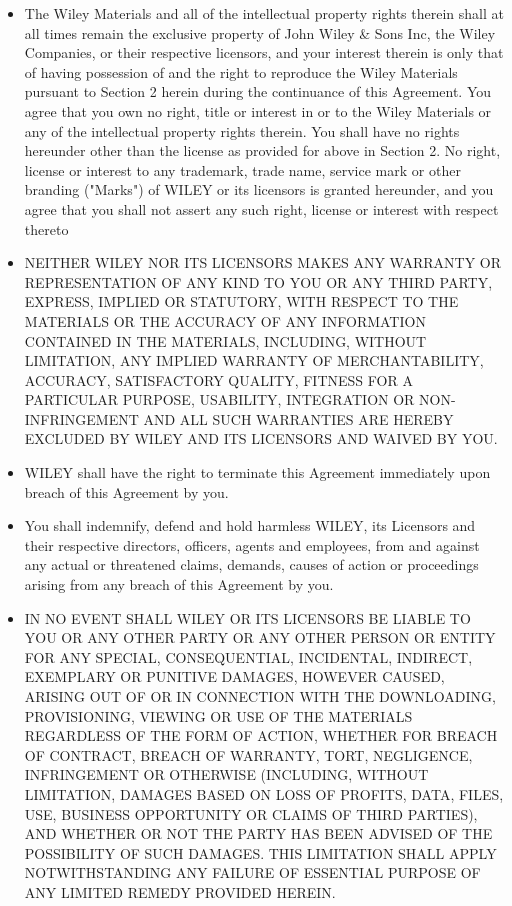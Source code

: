 \begin{itemize}
\item The Wiley Materials and all of the intellectual property rights therein shall at all times remain the exclusive property of John Wiley \& Sons Inc, the Wiley Companies, or their respective licensors, and your interest therein is only that of having possession of and the right to reproduce the Wiley Materials pursuant to Section 2 herein during the continuance of this Agreement. You agree that you own no right, title or interest in or to the Wiley Materials or any of the intellectual property rights therein. You shall have no rights hereunder other than the license as provided for above in Section 2. No right, license or interest to any trademark, trade name, service mark or other branding ("Marks") of WILEY or its licensors is granted hereunder, and you agree that you shall not assert any such right, license or interest with respect thereto

\item NEITHER WILEY NOR ITS LICENSORS MAKES ANY WARRANTY OR REPRESENTATION OF ANY KIND TO YOU OR ANY THIRD PARTY, EXPRESS, IMPLIED OR STATUTORY, WITH RESPECT TO THE MATERIALS OR THE ACCURACY OF ANY INFORMATION CONTAINED IN THE MATERIALS, INCLUDING, WITHOUT LIMITATION, ANY IMPLIED WARRANTY OF MERCHANTABILITY, ACCURACY, SATISFACTORY QUALITY, FITNESS FOR A PARTICULAR PURPOSE, USABILITY, INTEGRATION OR NON-INFRINGEMENT AND ALL SUCH WARRANTIES ARE HEREBY EXCLUDED BY WILEY AND ITS LICENSORS AND WAIVED BY YOU.

\item WILEY shall have the right to terminate this Agreement immediately upon breach of this Agreement by you.

\item You shall indemnify, defend and hold harmless WILEY, its Licensors and their respective directors, officers, agents and employees, from and against any actual or threatened claims, demands, causes of action or proceedings arising from any breach of this Agreement by you.

\item IN NO EVENT SHALL WILEY OR ITS LICENSORS BE LIABLE TO YOU OR ANY OTHER PARTY OR ANY OTHER PERSON OR ENTITY FOR ANY SPECIAL, CONSEQUENTIAL, INCIDENTAL, INDIRECT, EXEMPLARY OR PUNITIVE DAMAGES, HOWEVER CAUSED, ARISING OUT OF OR IN CONNECTION WITH THE DOWNLOADING, PROVISIONING, VIEWING OR USE OF THE MATERIALS REGARDLESS OF THE FORM OF ACTION, WHETHER FOR BREACH OF CONTRACT, BREACH OF WARRANTY, TORT, NEGLIGENCE, INFRINGEMENT OR OTHERWISE (INCLUDING, WITHOUT LIMITATION, DAMAGES BASED ON LOSS OF PROFITS, DATA, FILES, USE, BUSINESS OPPORTUNITY OR CLAIMS OF THIRD PARTIES), AND WHETHER OR NOT THE PARTY HAS BEEN ADVISED OF THE POSSIBILITY OF SUCH DAMAGES. THIS LIMITATION SHALL APPLY NOTWITHSTANDING ANY FAILURE OF ESSENTIAL PURPOSE OF ANY LIMITED REMEDY PROVIDED HEREIN.


\end{itemize}

